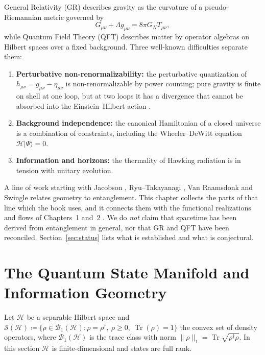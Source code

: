 \documentclass[11pt,a4paper,reqno]{amsart}
\theoremstyle{definition}
\numberwithin{equation}{section}
\newcommand{\Tr}{\operatorname{Tr}}
\begin{document}
General Relativity (GR) describes gravity as the curvature of a pseudo-Riemannian metric governed by
\begin{equation}
    \label{eq:einstein_classical}
    G_{\mu\nu} + \Lambda g_{\mu\nu} = 8\pi G_N T_{\mu\nu},
\end{equation}
while Quantum Field Theory (QFT) describes matter by operator algebras on Hilbert spaces over a fixed background. Three well-known difficulties separate them:
\begin{enumerate}[label=(\roman*)]
    \item \textbf{Perturbative non-renormalizability:} the perturbative quantization of $h_{\mu\nu} = g_{\mu\nu} - \eta_{\mu\nu}$ is non-renormalizable by power counting; pure gravity is finite on shell at one loop, but at two loops it has a divergence that cannot be absorbed into the Einstein--Hilbert action \cite{goroff1986}.
    \item \textbf{Background independence:} the canonical Hamiltonian of a closed universe is a combination of constraints, including the Wheeler--DeWitt equation $\mathcal{H}|\Psi\rangle = 0$.
    \item \textbf{Information and horizons:} the thermality of Hawking radiation is in tension with unitary evolution.
\end{enumerate}

A line of work starting with Jacobson \cite{jacobson1995thermodynamics}, Ryu--Takayanagi \cite{ryu2006holographic}, Van Raamsdonk \cite{vanraamsdonk2010building} and Swingle \cite{swingle2012entanglement} relates geometry to entanglement. This chapter collects the parts of that line which the book uses, and it connects them with the functional realizations and flows of Chapters~1 and~2 \cite{silvafilho2026functional, silvafilho2026flows}. We do \emph{not} claim that spacetime has been derived from entanglement in general, nor that GR and QFT have been reconciled. Section~\ref{sec:status} lists what is established and what is conjectural.

\section{The Quantum State Manifold and Information Geometry}
\label{sec:quantum_info_geom}

Let $\mathscr{H}$ be a separable Hilbert space and $\mathcal{S}(\mathscr{H}) \coloneqq \{\rho \in \mathcal{B}_1(\mathscr{H}) \colon \rho = \rho^\dagger, \ \rho \ge 0, \ \Tr(\rho) = 1\}$ the convex set of density operators, where $\mathcal{B}_1(\mathscr{H})$ is the trace class with norm $\|\rho\|_1 = \Tr\sqrt{\rho^\dagger \rho}$. In this section $\mathscr{H}$ is finite-dimensional and states are full rank.
\end{document}
